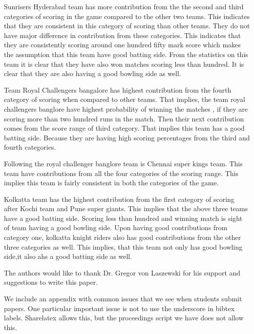 \documentclass[sigconf]{acmart}
\begin{document}
Sunrisers Hyderabad team has more contribution from the the second and third categories of scoring in the game compared to the other two teams. This indicates that they are consistent in this category of scoring than other teams. They do not have major difference in contribution from these categories. This indicates that they are consistently scoring around one hundred fifty mark score which makes the assumption that this team have good batting side. From the statistics on this team it is clear that they have also won matches scoring less than hundred. It is clear that they are also having a good bowling side as well. 

Team Royal Challengers bangalore has highest contribution from the fourth category of scoring when compared to other teams. That implies, the team royal challengers banglore have highest probability of winning the matches , if they are scoring more than two hundred runs in the match. Then their next contribution comes from the score range of third category. That implies this team has a good batting side. Because they are having high scoring percentages from the third and fourth categories. 

Following the royal challenger banglore team is Chennai super kings team. This team have contributions from all the four categories of the scoring range. This implies this team is fairly consistent in both the categories of the game. 

Kolkatta team has the highest contribution from the first category of scoring after Kochi team and Pune super giants. This implies that the above three teams have a good batting side. Scoring less than hundred and winning match is sight of team having a good bowling side. Upon having good contributions from category one, kolkatta knight riders also has good contributions from the other three categories as well. This implies, that this team not only has good bowling side,it also ahs a good batting side as well. 
 


\begin{acks}

  The authors would like to thank Dr. Gregor von Laszewski for his
  support and suggestions to write this paper.

\end{acks}


 

\appendix

We include an appendix with common issues that we see when students
submit papers. One particular important issue is not to use the
underscore in bibtex labels. Sharelatex allows this, but the
proceedings script we have does not allow this.
\end{document}
